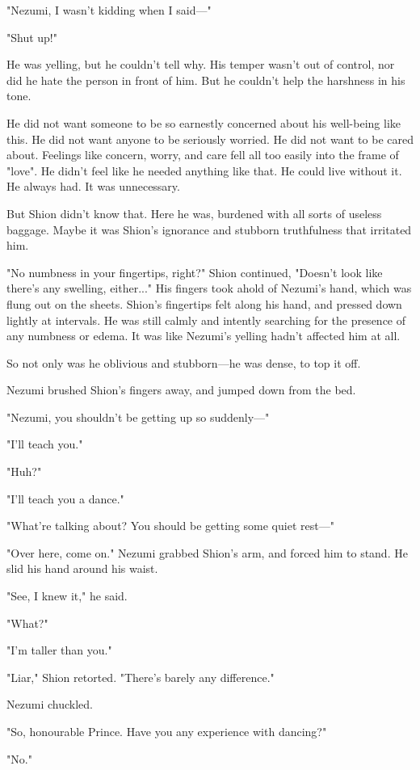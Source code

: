 "Nezumi, I wasn't kidding when I said---"

"Shut up!"

He was yelling, but he couldn't tell why. His temper wasn't out of
control, nor did he hate the person in front of him. But he couldn't
help the harshness in his tone.

He did not want someone to be so earnestly concerned about his
well-being like this. He did not want anyone to be seriously worried. He
did not want to be cared about. Feelings like concern, worry, and care
fell all too easily into the frame of "love". He didn't feel like he
needed anything like that. He could live without it. He always had. It
was unnecessary.

But Shion didn't know that. Here he was, burdened with all sorts of
useless baggage. Maybe it was Shion's ignorance and stubborn
truthfulness that irritated him.

"No numbness in your fingertips, right?" Shion continued, "Doesn't look
like there's any swelling, either..." His fingers took ahold of Nezumi's
hand, which was flung out on the sheets. Shion's fingertips felt along
his hand, and pressed down lightly at intervals. He was still calmly and
intently searching for the presence of any numbness or edema. It was
like Nezumi's yelling hadn't affected him at all.

So not only was he oblivious and stubborn---he was dense, to top it off.

Nezumi brushed Shion's fingers away, and jumped down from the bed.

"Nezumi, you shouldn't be getting up so suddenly---"

"I'll teach you."

"Huh?"

"I'll teach you a dance."

"What're talking about? You should be getting some quiet rest---"

"Over here, come on." Nezumi grabbed Shion's arm, and forced him to
stand. He slid his hand around his waist.

"See, I knew it," he said.

"What?"

"I'm taller than you."

"Liar," Shion retorted. "There's barely any difference."

Nezumi chuckled.

"So, honourable Prince. Have you any experience with dancing?"

"No."

